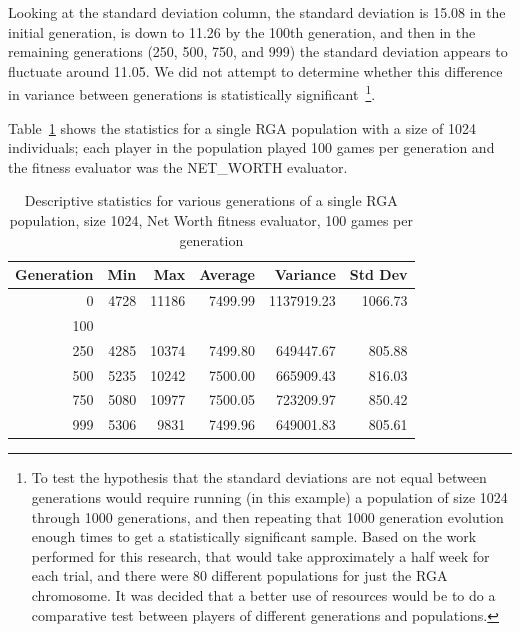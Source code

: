 Looking at the standard deviation column, the standard deviation is 15.08 in the
initial generation, is down to 11.26 by the 100th generation, and then in the
remaining generations (250, 500, 750, and 999) the standard deviation appears to
fluctuate around 11.05. We did not attempt to determine whether this difference
in variance between generations is statistically significant~\footnote{To test
the hypothesis that the standard deviations are not equal between generations
would require running (in this example) a population of size 1024 through 1000
generations, and then repeating that 1000 generation evolution enough times to
get a statistically significant sample. Based on the work performed for this
research, that would take approximately a half week for each trial, and there
were 80 different populations for just the RGA chromosome. It was decided that a
better use of resources would be to do a comparative test between players of
different generations and populations.}.

Table~\ref{table-stats-for-s1024-n100-netw} shows the statistics for a single
RGA population with a size of 1024 individuals; each player in the population
played 100 games per generation and the fitness evaluator was the NET\_WORTH
evaluator.

\begin{table}[ht]
\begin{center}
\begin{tabular}{ | r || r | r | r | r | r |}
\hline                        
Generation & Min & Max & Average & Variance & Std Dev \\ \hline \hline
0   & 4728 & 11186 & 7499.99 & 1137919.23 & 1066.73 \\ \hline
100 & & & & & \\ \hline 
250 & 4285 & 10374 & 7499.80 &  649447.67 & 805.88 \\ \hline
500 & 5235 & 10242 & 7500.00 & 665909.43 & 816.03 \\ \hline
750 & 5080 & 10977 & 7500.05 & 723209.97 & 850.42 \\ \hline
999 & 5306 & 9831 & 7499.96 & 649001.83 & 805.61 \\ \hline
\end{tabular}
\caption{Descriptive statistics for various generations of a single RGA
population, size 1024, Net Worth fitness evaluator, 100 games per generation}
\label{table-stats-for-s1024-n100-netw}
\end{center}
\end{table}



